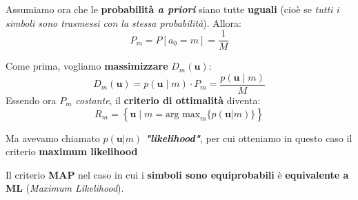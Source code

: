 Assumiamo ora che le \textbf{probabilità \textit{a priori}} siano tutte \textbf{uguali} 
(cioè se \textit{tutti i simboli sono trasmessi con la stessa probabilità}). 
Allora:
\[
    P_m = P[a_{0} = m] = \frac{1}{M}
\]

Come prima, vogliamo \textbf{massimizzare} $D_m(\mathbf{u})$:
\[
    D_m(\mathbf{u}) = p(\mathbf{u} \;|\; m)\cdot P_m = \frac{p(\mathbf{u} \;|\; m)}{M}
\]
Essendo ora $P_m$ \textit{costante}, il \textbf{criterio di ottimalità} diventa:
\[
    R_m = \left\{ \mathbf{u} \;|\; m = \text{arg max}_m \{ p(\mathbf{u}|m) \} \right\}  
\]

Ma avevamo chiamato $p(\mathbf{u}|m)$ \textbf{\textit{"likelihood"}}, per cui
otteniamo in questo caso il criterio \textbf{maximum likelihood}

\begin{remark}
    Il criterio \textbf{MAP} nel caso in cui i \textbf{simboli sono equiprobabili}
    è \textbf{equivalente a ML} (\textit{Maximum Likelihood}).
\end{remark}

